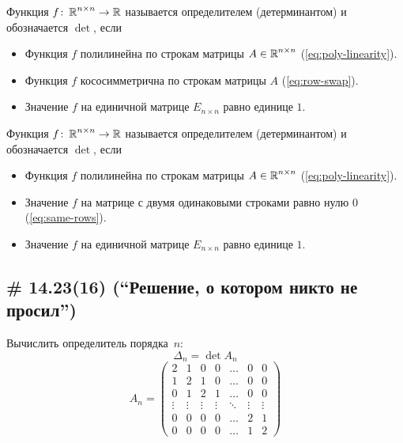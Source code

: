 \documentclass[a4paper,12pt]{article}
\theoremstyle{remark}
\begin{document}
  \begin{definition}
    Функция $f \colon \operatorname{\mathbb R}^{n \times n} \to \operatorname{\mathbb R}$ называется определителем (детерминантом) и обозначается $\det$, если
    \begin{itemize}
      \item Функция $f$ полилинейна по строкам матрицы $A \in \operatorname{\mathbb R}^{n \times n}$ (\ref{eq:poly-linearity}).
      \item Функция $f$ кососимметрична по строкам матрицы $A$ (\ref{eq:row-swap}).
      \item Значение $f$ на единичной матрице $E_{n \times n}$ равно единице $1$.
    \end{itemize}
  \end{definition}
  
  \begin{definition}
    Функция $f \colon \operatorname{\mathbb R}^{n \times n} \to \operatorname{\mathbb R}$ называется определителем (детерминантом) и обозначается $\det$, если
    \begin{itemize}
      \item Функция $f$ полилинейна по строкам матрицы $A \in \operatorname{\mathbb R}^{n \times n}$ (\ref{eq:poly-linearity}).
      \item Значение $f$ на матрице с двумя одинаковыми строками равно нулю $0$ (\ref{eq:same-rows}).
      \item Значение $f$ на единичной матрице $E_{n \times n}$ равно единице $1$.
    \end{itemize}
  \end{definition}
  
  
  \subsection{\# 14.23(16) (``Решение, о котором никто не просил'')}
  
  Вычислить определитель порядка~$n$:
  \[
    \Delta_n = \det A_n
  \]
  \[
    A_n = \begin{pmatrix}
      2      & 1      & 0      & 0      & \ldots & 0      & 0\\
      1      & 2      & 1      & 0      & \ldots & 0      & 0\\
      0      & 1      & 2      & 1      & \ldots & 0      & 0\\
      \vdots & \vdots & \vdots & \vdots & \ddots & \vdots & \vdots\\
      0      & 0      & 0      & 0      & \ldots & 2      & 1\\
      0      & 0      & 0      & 0      & \ldots & 1      & 2
    \end{pmatrix}
  \]
  
\end{document}
